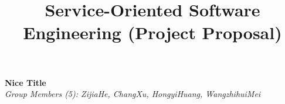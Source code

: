 \documentclass[runningheads]{llncs}
\begin{document}
\title{\large{Service-Oriented Software Engineering (Project Proposal)}}
\author{}
\institute{}
\maketitle
\vspace{-1cm}



\begin{center}
\Large{\textbf{Nice Title}} \\ %
\vspace{0.2cm}
\large{\emph{Group Members (5): ZijiaHe, ChangXu, HongyiHuang, WangzhihuiMei}} \\%
\vspace{0.3cm}  
\end{center}

\noindent
\end{document}
